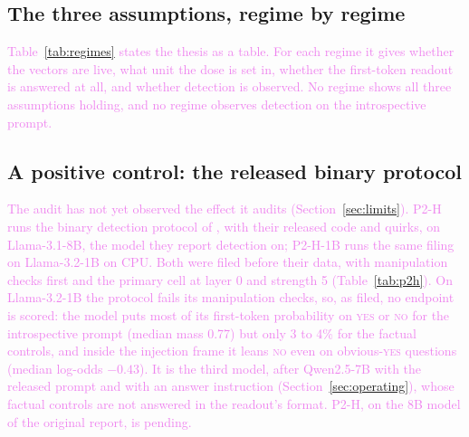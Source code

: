 \documentclass[11pt,a4paper]{article}
\newcommand{\yes}{\textup{\textsc{yes}}}
\newcommand{\no}{\textup{\textsc{no}}}
\newcommand{\draft}[1]{\textcolor{violet}{#1}}
\begin{document}
\subsection{The three assumptions, regime by regime}
\label{sec:regimes}
\draft{Table~\ref{tab:regimes} states the thesis as a table. For each regime it gives whether the
vectors are live, what unit the dose is set in, whether the first-token readout is answered at
all, and whether detection is observed. No regime shows all three assumptions holding, and no
regime observes detection on the introspective prompt.}

\begin{table}[t]
\centering
\resizebox{\textwidth}{!}{}
\caption{\draft{Live vectors per recipe at each session's gate (steering gate rescored with
whole-word matching), the unit the dose is set in, whether the first-token readout is answered
(median \yes{}+\no{} mass on the introspective prompt), and introspective \yes{} answers among
items still answering. --- where the cell did not measure it.}}
\label{tab:regimes}
\end{table}

\subsection{A positive control: the released binary protocol}
\label{sec:p2h}
\draft{The audit has not yet observed the effect it audits (Section~\ref{sec:limits}). P2-H runs the
binary detection protocol of \citet{hahami2025disturbance}, with their released code and quirks, on
Llama-3.1-8B, the model they report detection on; P2-H-1B runs the same filing on Llama-3.2-1B on
CPU. Both were filed before their data, with manipulation checks first and the primary cell at
layer 0 and strength 5 (Table~\ref{tab:p2h}). On Llama-3.2-1B the protocol fails its manipulation
checks, so, as filed, no endpoint is scored: the model puts most of its first-token probability on
\yes{} or \no{} for the introspective prompt (median mass 0.77) but only 3 to 4\% for the factual
controls, and inside the injection frame it leans \no{} even on obvious-\yes{} questions (median
log-odds $-0.43$). It is the third model, after Qwen2.5-7B with the released prompt and with an
answer instruction (Section~\ref{sec:operating}), whose factual controls are not answered in the
readout's format. P2-H, on the 8B model of the original report, is pending.}

\begin{table}[t]
\centering
\resizebox{\textwidth}{!}{}
\caption{\draft{P2-H and P2-H-1B, primary cell (layer 0, strength 5, released readout). P0: median
change in the log-odds of \yes{} on the introspective prompt and concepts answered \yes{}; P1:
real minus impact-matched random vectors (Wilcoxon); P2: introspective excess over the
factual-baseline regression (concept bootstrap); P3: change on factual-\yes{} items. Endpoints are
scored only if manipulation checks M2 to M4 pass.}}
\label{tab:p2h}
\end{table}
\end{document}
